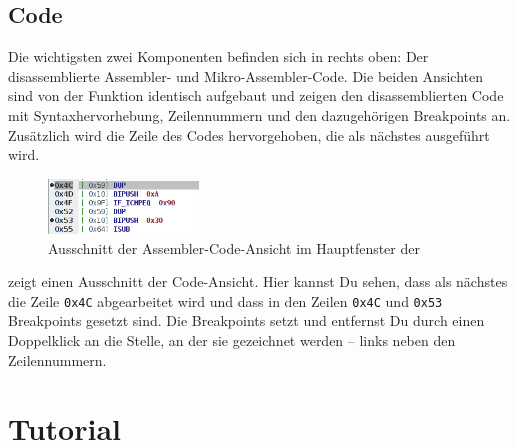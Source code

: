 \subsection{Code}
Die wichtigsten zwei Komponenten befinden sich in  rechts oben: Der disassemblierte Assembler- und Mikro-Assembler-Code. Die beiden Ansichten sind von der Funktion identisch aufgebaut und zeigen den disassemblierten Code mit Syntaxhervorhebung, Zeilennummern und den dazugehörigen Breakpoints an. Zusätzlich wird die Zeile des Codes hervorgehoben, die als nächstes ausgeführt wird.

\begin{figure}[h]
	\centering
	\includegraphics[width=4cm]{images/main-frame-code-part}
	\caption{Ausschnitt der Assembler-Code-Ansicht im Hauptfenster der \mdg{}}
\end{figure}

 zeigt einen Ausschnitt der Code-Ansicht. Hier kannst Du sehen, dass als nächstes die Zeile \texttt{0x4C} abgearbeitet wird und dass in den Zeilen \texttt{0x4C} und \texttt{0x53} Breakpoints gesetzt sind. Die Breakpoints setzt und entfernst Du durch einen Doppelklick an die Stelle, an der sie gezeichnet werden -- links neben den Zeilennummern.


\section{Tutorial}